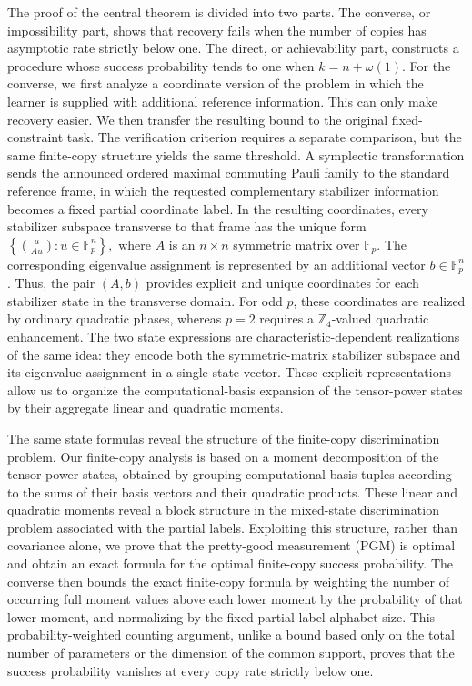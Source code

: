 \documentclass[11pt]{article}
\newcommand{\F}{\mathbb F}
\newcommand{\1}{\mathbf 1}
\theoremstyle{plain}
\theoremstyle{definition}
\theoremstyle{remark}
\begin{document}
The proof of the central theorem is divided into two parts. The converse, or impossibility part, shows that recovery fails when the number of copies has asymptotic rate strictly below one. The direct, or achievability part, constructs a procedure whose success probability tends to one when $k=n+\omega(1)$. For the converse, we first analyze a coordinate version of the problem in which the learner is supplied with additional reference information. This can only make recovery easier. We then transfer the resulting bound to the original fixed-constraint task. The verification criterion requires a separate comparison, but the same finite-copy structure yields the same threshold.  
A symplectic transformation sends the announced ordered maximal commuting Pauli family to the standard reference frame, in which the requested complementary stabilizer information becomes a fixed partial coordinate label.
In the resulting coordinates, every stabilizer subspace transverse to that frame has the unique form \( \left\{\binom{u}{Au}:u\in\F_p^n\right\}, \) 
where $A$ is an $n\times n$ symmetric matrix over $\F_p$. 
The corresponding eigenvalue assignment is represented by an additional vector $b\in\F_p^n$. Thus, the pair $(A,b)$ provides explicit and unique coordinates for each stabilizer state in the transverse domain.
For odd \(p\), these coordinates are realized by ordinary quadratic phases, whereas \(p=2\) requires a \(\mathbb Z_4\)-valued quadratic enhancement.
The two state expressions are characteristic-dependent realizations of the same idea: they encode both the symmetric-matrix stabilizer subspace and its eigenvalue assignment in a single state vector. These explicit representations allow us to organize the computational-basis expansion of the tensor-power states by their aggregate linear and quadratic moments.

The same state formulas reveal the structure of the finite-copy discrimination problem.  Our finite-copy analysis is based on a moment decomposition of the tensor-power states, obtained by grouping computational-basis tuples according to the sums of their basis vectors and their quadratic products. 
These linear and quadratic moments reveal a block structure in the mixed-state discrimination problem associated with the partial labels. 
Exploiting this structure, rather than covariance alone, we prove that the pretty-good measurement (PGM) is optimal and obtain an exact formula for the optimal finite-copy success probability.
The converse then bounds the exact finite-copy formula by weighting the number of occurring full moment values above each lower moment by the probability of that lower moment, and normalizing by the fixed partial-label alphabet size. This probability-weighted counting argument, unlike a bound based only on the total number of parameters or the dimension of the common support, proves that the success probability vanishes at every copy rate strictly below one. 
\end{document}
